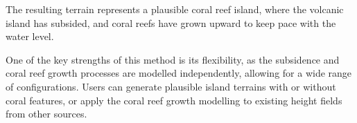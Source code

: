 







The resulting terrain represents a plausible coral reef island, where the volcanic island has subsided, and coral reefs have grown upward to keep pace with the water level. %

One of the key strengths of this method is its flexibility, as the subsidence and coral reef growth processes are modelled independently, allowing for a wide range of configurations. Users can generate plausible island terrains with or without coral features, or apply the coral reef growth modelling to existing height fields from other sources. 
